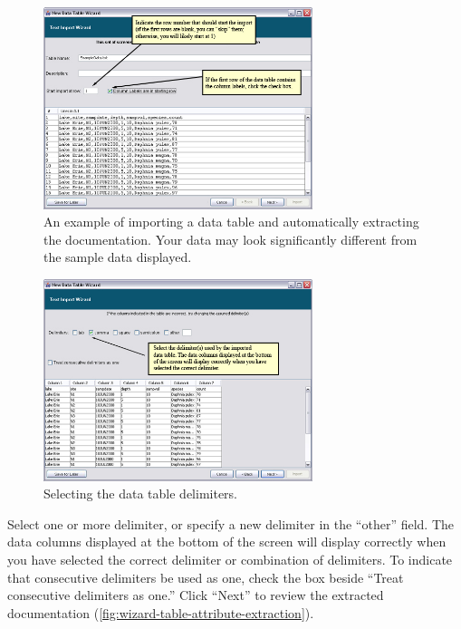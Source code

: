\begin{figure}
  \centering
    \includegraphics[width=0.7\textwidth]{images/wizard-table-import-extract.jpg}
  \caption{An example of importing a data table and automatically
    extracting the documentation. Your data may look significantly
    different from the sample data displayed.}
  \label{fig:wizard-table-import-extract}
\end{figure}

\begin{figure}
  \centering
    \includegraphics[width=0.7\textwidth]{images/wizard-table-delimiter.jpg}
  \caption{Selecting the data table delimiters.}
  \label{fig:wizard-table-delimiter}
\end{figure}

Select one or more delimiter, or specify a new delimiter in the
``other'' field. The data columns displayed at the bottom of the screen
will display correctly when you have selected the correct delimiter or
combination of delimiters. To indicate that consecutive delimiters be
used as one, check the box beside ``Treat consecutive delimiters as
one.'' Click ``Next'' to review the extracted documentation
(\autoref{fig:wizard-table-attribute-extraction}).

